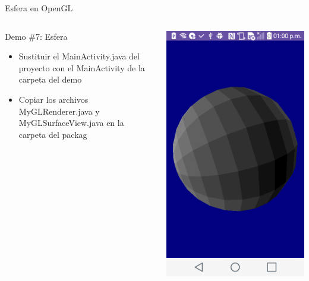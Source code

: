\documentclass[aspectratio=169,compress]{beamer}
\begin{document}
\begin{frame}{Esfera en OpenGL}
\begin{columns}
\begin{column}{0.7\textwidth}

\begin{block}{Demo \#7: Esfera}
\begin{itemize}
\item Sustituir el MainActivity.java del proyecto con el MainActivity de la carpeta del demo
\item Copiar los archivos MyGLRenderer.java y MyGLSurfaceView.java en la carpeta del packag
\end{itemize}
\end{block}
\end{column}
\begin{column}{0.3\textwidth}
\begin{center}
\includegraphics[width=1.0\linewidth]{PantallazosDemoTaller/Demo7.png}

\end{center}
\end{column}
\end{columns}
\end{frame}
\end{document}
